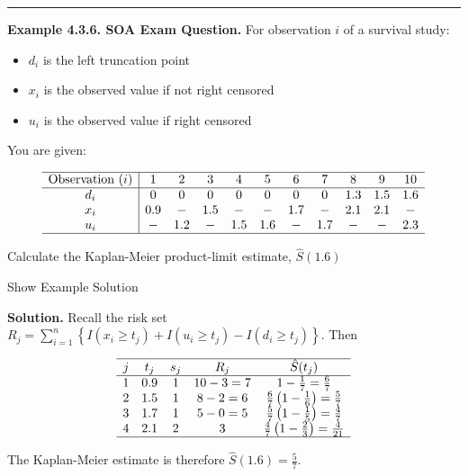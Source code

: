 \documentclass[]{book}
\providecommand{\tightlist}{%
  \setlength{\itemsep}{0pt}\setlength{\parskip}{0pt}}
\theoremstyle{definition}
\theoremstyle{definition}
\theoremstyle{definition}
\theoremstyle{remark}
\begin{document}
\begin{center}\rule{0.5\linewidth}{\linethickness}\end{center}

\textbf{Example 4.3.6. SOA Exam Question.} For observation \(i\) of a
survival study:

\begin{itemize}
\tightlist
\item
  \(d_i\) is the left truncation point
\item
  \(x_i\) is the observed value if not right censored
\item
  \(u_i\) is the observed value if right censored
\end{itemize}

You are given:

\[\begin{array}{c|cccccccccc}
\hline
\text{Observation } (i) & 1 & 2 & 3 & 4 & 5 & 6 & 7 & 8 & 9 & 10\\ \hline
d_i & 0 & 0 & 0 & 0 & 0 & 0 & 0 & 1.3 & 1.5 & 1.6\\
x_i & 0.9 & - & 1.5 & - & - & 1.7 & - & 2.1 & 2.1 & - \\
u_i & - & 1.2 & - & 1.5 & 1.6 & - & 1.7 & - & - & 2.3 \\
\hline
\end{array}\]

Calculate the Kaplan-Meier product-limit estimate, \(\hat{S}(1.6)\)

Show Example Solution

\hypertarget{toggleExampleSelect.3.6}{}
\textbf{Solution.} Recall the risk set
\(R_j = \sum_{i=1}^n \left\{ I(x_i \geq t_{j}) + I(u_i \geq t_{j}) - I(d_i \geq t_{j}) \right\}\).
Then

\[\begin{array}{ccccc}
\hline
j & t_j & s_j & R_j & \hat{S}(t_j) \\
\hline 
1  & 0.9   & 1   & 10-3 = 7 & 1-\frac{1}{7} = \frac{6}{7} \\
2  & 1.5   & 1   & 8-2 = 6  & \frac{6}{7}\left( 1 - \frac{1}{6} \right) = \frac{5}{7}\\
3  & 1.7   & 1   & 5-0 = 5  & \frac{5}{7}\left( 1 - \frac{1}{5} \right) = \frac{4}{7}\\
4  & 2.1   & 2   & 3        & \frac{4}{7}\left( 1 - \frac{2}{3}\right) = \frac{4}{21}\\
\hline
\end{array}\]

The Kaplan-Meier estimate is therefore \(\hat{S}(1.6) = \frac{5}{7}\).
\end{document}
